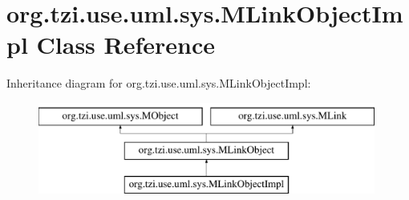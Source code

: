\hypertarget{classorg_1_1tzi_1_1use_1_1uml_1_1sys_1_1_m_link_object_impl}{\section{org.\-tzi.\-use.\-uml.\-sys.\-M\-Link\-Object\-Impl Class Reference}
\label{classorg_1_1tzi_1_1use_1_1uml_1_1sys_1_1_m_link_object_impl}
}
Inheritance diagram for org.\-tzi.\-use.\-uml.\-sys.\-M\-Link\-Object\-Impl\-:\begin{figure}[H]
\begin{center}
\leavevmode
\includegraphics[height=3.000000cm]{classorg_1_1tzi_1_1use_1_1uml_1_1sys_1_1_m_link_object_impl}
\end{center}
\end{figure}
